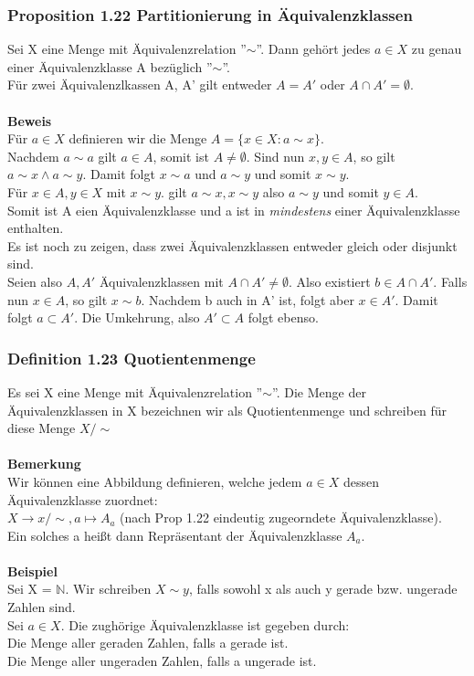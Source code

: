 \documentclass{article}
\newcommand{\mN}{$\mathbb{N}$}
\begin{document}
\subsubsection{Proposition 1.22 Partitionierung in Äquivalenzklassen}
Sei X eine Menge mit Äquivalenzrelation ''$\sim$''. Dann gehört jedes $a \in X$ zu genau einer Äquivalenzklasse A bezüglich ''$\sim$''.\\
Für zwei Äquivalenzlkassen A, A' gilt entweder $A = A'$ oder $A\cap A' = \emptyset$.\\
\\
\textbf{Beweis}\\
Für $a \in X$ definieren wir die Menge $A = \{x \in X : a \sim x\}$.\\
Nachdem $a \sim a$ gilt $a \in A$, somit ist $A \neq \emptyset$. Sind nun $x, y \in A$, so gilt $a \sim x \land a \sim y$. Damit folgt $x \sim a$ und $a \sim y$ und somit $x \sim y$.\\
Für $x \in A, y \in X$ mit $x \sim y$. gilt $a \sim x, x \sim y$ also $a \sim y$ und somit $y \in A$.\\
Somit ist A eien Äquivalenzklasse und a ist in \textit{mindestens} einer Äquivalenzklasse enthalten.\\
Es ist noch zu zeigen, dass zwei Äquivalenzklassen entweder gleich oder disjunkt sind.\\
Seien also $A, A'$ Äquivalenzklassen mit $A \cap A' \neq \emptyset$. Also existiert $b \in A\cap A'$. Falls nun $x \in A$, so gilt $x \sim b$. Nachdem b auch in A' ist, folgt aber $x \in A'$. Damit folgt $a \subset A'$. Die Umkehrung, also $A' \subset A$ folgt ebenso.

\subsubsection{Definition 1.23 Quotientenmenge}
Es sei X eine Menge mit Äquivalenzrelation ''$\sim$''. Die Menge der Äquivalenzklassen in X bezeichnen wir  als Quotientenmenge und schreiben
 für diese Menge $X/{\sim}$\\
 \\
 \textbf{Bemerkung}\\
 Wir können eine Abbildung definieren, welche jedem $a \in X$ dessen Äquivalenzklasse zuordnet:\\
 $X \to x/{\sim}, a \mapsto A_a$ (nach Prop 1.22 eindeutig zugeorndete Äquivalenzklasse).\\
 Ein solches a hei\ss{}t dann Repräsentant der Äquivalenzklasse $A_a$.\\
 \\
 \textbf{Beispiel}\\
 Sei X = \mN. Wir schreiben $X \sim y$, falls sowohl x als auch y gerade bzw. ungerade Zahlen sind.\\
 Sei $a \in X$. Die zughörige Äquivalenzklasse ist gegeben durch:\\
 Die Menge aller geraden Zahlen, falls a gerade ist.\\
 Die Menge aller ungeraden Zahlen, falls a ungerade ist.
\end{document}
